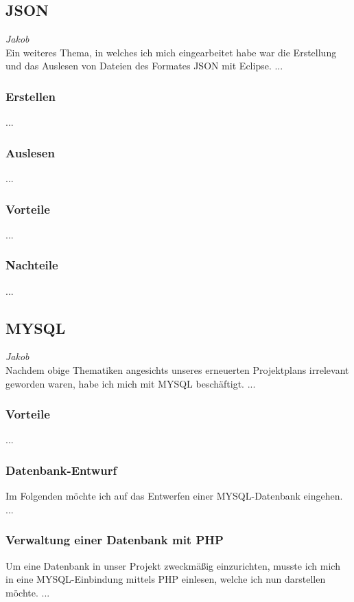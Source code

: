 \documentclass[12pt,a4paper,bibliography=totocnumbered,listof=totocnumbered]{scrartcl}
\begin{document}
\subsection{JSON}
\label{sec:JSON}
\emph{Jakob}\\
Ein weiteres Thema, in welches ich mich eingearbeitet habe war die Erstellung und das Auslesen von Dateien
des Formates JSON mit Eclipse.
...

\subsubsection{Erstellen}
...

\subsubsection{Auslesen}
...

\subsubsection{Vorteile}
...

\subsubsection{Nachteile}
...

\subsection{MYSQL}
\label{sec:MYSQL}
\emph{Jakob}\\
Nachdem obige Thematiken angesichts unseres erneuerten Projektplans irrelevant geworden waren, habe ich mich 
mit MYSQL beschäftigt.
...

\subsubsection{Vorteile}
...

\subsubsection{Datenbank-Entwurf}
Im Folgenden möchte ich auf das Entwerfen einer MYSQL-Datenbank eingehen.
...

\subsubsection{Verwaltung einer Datenbank mit PHP}
Um eine Datenbank in unser Projekt zweckmäßig einzurichten, musste ich mich in eine MYSQL-Einbindung mittels PHP einlesen, welche ich nun darstellen möchte.
...
\end{document}
